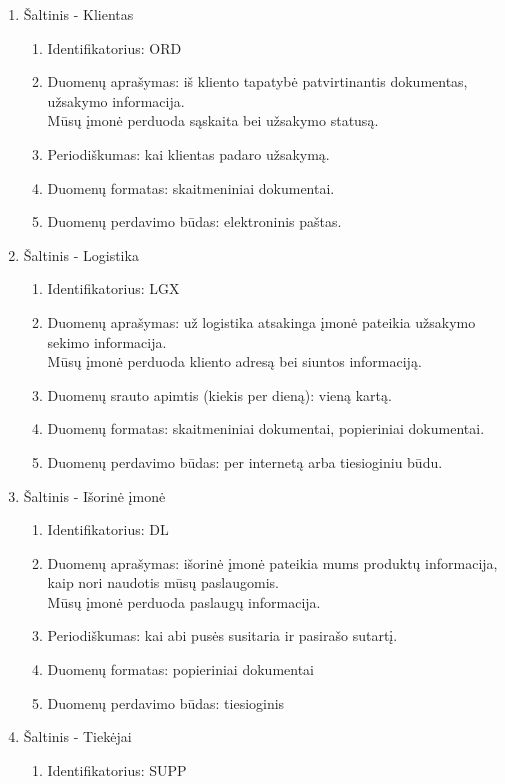\documentclass{VUMIFPSkursinis}
\begin{document}
\begin{enumerate}
	\item Šaltinis - Klientas
	\begin{enumerate}
		\item Identifikatorius: ORD
		\item Duomenų aprašymas: iš kliento tapatybė patvirtinantis dokumentas, užsakymo informacija. \\ Mūsų įmonė perduoda sąskaita bei užsakymo statusą.
		\item Periodiškumas: kai klientas padaro užsakymą.
		\item Duomenų formatas: skaitmeniniai dokumentai. 
		\item Duomenų perdavimo būdas: elektroninis paštas.
	\end{enumerate}
	\item Šaltinis - Logistika
	\begin{enumerate}
		\item Identifikatorius: LGX
		\item Duomenų aprašymas: už logistika atsakinga įmonė pateikia užsakymo sekimo informacija. \\ Mūsų įmonė perduoda kliento adresą bei siuntos informaciją.
 		\item Duomenų srauto apimtis (kiekis per dieną): vieną kartą.
		\item Duomenų formatas: skaitmeniniai dokumentai, popieriniai dokumentai.
		\item Duomenų perdavimo būdas: per internetą arba tiesioginiu būdu.
	\end{enumerate}
	\item Šaltinis - Išorinė įmonė
	\begin{enumerate}
		\item Identifikatorius: DL
		\item Duomenų aprašymas: išorinė įmonė pateikia mums produktų informacija, kaip nori naudotis mūsų paslaugomis. \\ Mūsų įmonė perduoda paslaugų informacija.
		\item Periodiškumas: kai abi pusės susitaria ir pasirašo sutartį.
		\item Duomenų formatas: popieriniai dokumentai
		\item Duomenų perdavimo būdas: tiesioginis
	\end{enumerate}
	\item Šaltinis - Tiekėjai
	\begin{enumerate}
		\item Identifikatorius: SUPP

\end{enumerate}
\end{enumerate}
\end{document}
